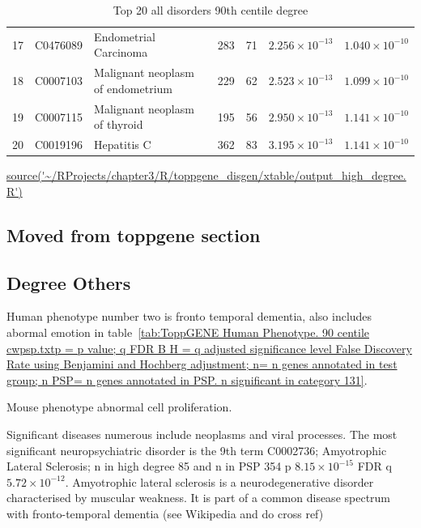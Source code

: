 \begin{table}[ht]
\begin{adjustbox}{width=\textwidth}
\begin{tabular}{lllllll}
  17 & C0476089 & Endometrial Carcinoma & 283 & 71 & $2.256 \times 10^{-13}$ & $1.040 \times 10^{-10}$ \\ 
  18 & C0007103 & Malignant neoplasm of endometrium & 229 & 62 & $2.523 \times 10^{-13}$ & $1.099 \times 10^{-10}$ \\ 
  19 & C0007115 & Malignant neoplasm of thyroid & 195 & 56 & $2.950 \times 10^{-13}$ & $1.141 \times 10^{-10}$ \\ 
  20 & C0019196 & Hepatitis C & 362 & 83 & $3.195 \times 10^{-13}$ & $1.141 \times 10^{-10}$ \\ 
   \hline
\end{tabular}
\end{adjustbox}
\caption{Top 20 all disorders 90th centile degree} 
\tiny\url{source('~/RProjects/chapter3/R/toppgene_disgen/xtable/output_high_degree.R')}
\end{table}

\subsection{Moved from toppgene section}
\subsection{Degree Others}
Human phenotype number two is fronto temporal dementia, also includes abormal emotion in table~\ref{tab:ToppGENE Human Phenotype. 90 centile cwpsp.txtp = p value; q FDR B H = q adjusted significance level False Discovery Rate using Benjamini and Hochberg adjustment; n= n genes annotated in test group; n PSP= n genes annotated in PSP. n significant in category 131}.

Mouse phenotype abnormal cell proliferation.

Significant diseases numerous include neoplasms and viral processes. The most significant neuropsychiatric disorder is the 9th term C0002736;  Amyotrophic Lateral Sclerosis; n in high degree 85 and n in PSP 354 p $8.15 \times 10^{-15}$ FDR q $5.72 \times 10^{-12}$. Amyotrophic lateral sclerosis is a neurodegenerative disorder characterised by muscular weakness. It is part of a common disease spectrum with fronto-temporal dementia (see Wikipedia and do cross ref) 





